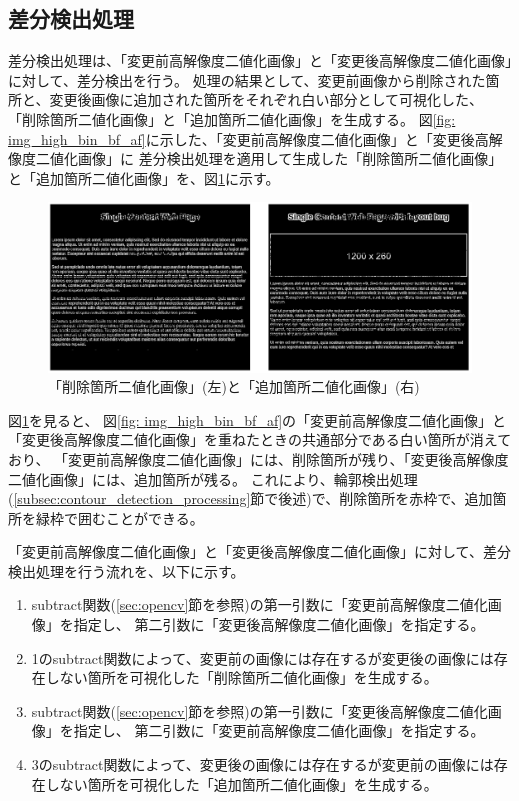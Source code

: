 \subsection{差分検出処理}\label{subsec:difference_detection_process}
差分検出処理は、「変更前高解像度二値化画像」と「変更後高解像度二値化画像」に対して、差分検出を行う。
処理の結果として、変更前画像から削除された箇所と、変更後画像に追加された箇所をそれぞれ白い部分として可視化した、
「削除箇所二値化画像」と「追加箇所二値化画像」を生成する。
図\ref{fig: img_high_bin_bf_af}に示した、「変更前高解像度二値化画像」と「変更後高解像度二値化画像」に
差分検出処理を適用して生成した「削除箇所二値化画像」と「追加箇所二値化画像」を、図\ref{fig: img_del_add_bin_bf_af}に示す。
\begin{figure}[tp]
    \begin{center}
        \includegraphics[width=1.0\columnwidth]{image/4_img_del_add_bin_bf_af.png}
        \caption{「削除箇所二値化画像」(左)と「追加箇所二値化画像」(右)}
        \label{fig: img_del_add_bin_bf_af}
    \end{center}
\end{figure}
図\ref{fig: img_del_add_bin_bf_af}を見ると、
図\ref{fig: img_high_bin_bf_af}の「変更前高解像度二値化画像」と「変更後高解像度二値化画像」を重ねたときの共通部分である白い箇所が消えており、
「変更前高解像度二値化画像」には、削除箇所が残り、「変更後高解像度二値化画像」には、追加箇所が残る。
これにより、輪郭検出処理(\ref{subsec:contour_detection_processing}節で後述)で、削除箇所を赤枠で、追加箇所を緑枠で囲むことができる。
\par
「変更前高解像度二値化画像」と「変更後高解像度二値化画像」に対して、差分検出処理を行う流れを、以下に示す。
\begin{enumerate}
    \item subtract関数(\ref{sec:opencv}節を参照)の第一引数に「変更前高解像度二値化画像」を指定し、
          第二引数に「変更後高解像度二値化画像」を指定する。
    \item 1のsubtract関数によって、変更前の画像には存在するが変更後の画像には存在しない箇所を可視化した「削除箇所二値化画像」を生成する。
    \item subtract関数(\ref{sec:opencv}節を参照)の第一引数に「変更後高解像度二値化画像」を指定し、
          第二引数に「変更前高解像度二値化画像」を指定する。
    \item 3のsubtract関数によって、変更後の画像には存在するが変更前の画像には存在しない箇所を可視化した「追加箇所二値化画像」を生成する。
\end{enumerate}

